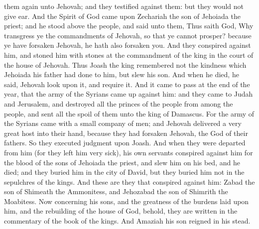 them again unto Jehovah; and they testified against them: but they would not give ear.  And the Spirit of God came upon Zechariah the son of Jehoiada the priest; and he stood above the people, and said unto them, Thus saith God, Why transgress ye the commandments of Jehovah, so that ye cannot prosper? because ye have forsaken Jehovah, he hath also forsaken you. And they conspired against him, and stoned him with stones at the commandment of the king in the court of the house of Jehovah. Thus Joash the king remembered not the kindness which Jehoiada his father had done to him, but slew his son. And when he died, he said, Jehovah look upon it, and require it.  And it came to pass at the end of the year, that the army of the Syrians came up against him: and they came to Judah and Jerusalem, and destroyed all the princes of the people from among the people, and sent all the spoil of them unto the king of Damascus. For the army of the Syrians came with a small company of men; and Jehovah delivered a very great host into their hand, because they had forsaken Jehovah, the God of their fathers. So they executed judgment upon Joash.  And when they were departed from him (for they left him very sick), his own servants conspired against him for the blood of the sons of Jehoiada the priest, and slew him on his bed, and he died; and they buried him in the city of David, but they buried him not in the sepulchres of the kings. And these are they that conspired against him: Zabad the son of Shimeath the Ammonitess, and Jehozabad the son of Shimrith the Moabitess. Now concerning his sons, and the greatness of the burdens laid upon him, and the rebuilding of the house of God, behold, they are written in the commentary of the book of the kings. And Amaziah his son reigned in his stead. 

